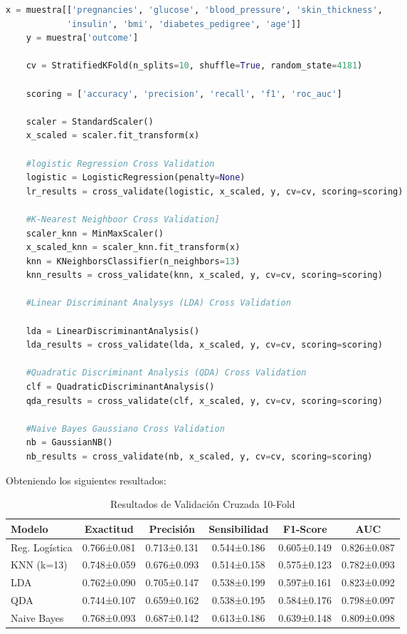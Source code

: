 \documentclass[12pt,a4paper]{article}
\begin{document}
\begin{lstlisting}[language=Python, frame=single, basicstyle=\ttfamily\small, breaklines=true]
    x = muestra[['pregnancies', 'glucose', 'blood_pressure', 'skin_thickness',
            'insulin', 'bmi', 'diabetes_pedigree', 'age']]
    y = muestra['outcome']

    cv = StratifiedKFold(n_splits=10, shuffle=True, random_state=4181)  

    scoring = ['accuracy', 'precision', 'recall', 'f1', 'roc_auc']

    scaler = StandardScaler()
    x_scaled = scaler.fit_transform(x)

    #logistic Regression Cross Validation
    logistic = LogisticRegression(penalty=None)
    lr_results = cross_validate(logistic, x_scaled, y, cv=cv, scoring=scoring)

    #K-Nearest Neighboor Cross Validation]
    scaler_knn = MinMaxScaler()
    x_scaled_knn = scaler_knn.fit_transform(x)
    knn = KNeighborsClassifier(n_neighbors=13)
    knn_results = cross_validate(knn, x_scaled, y, cv=cv, scoring=scoring)

    #Linear Discriminant Analysys (LDA) Cross Validation

    lda = LinearDiscriminantAnalysis()
    lda_results = cross_validate(lda, x_scaled, y, cv=cv, scoring=scoring)  

    #Quadratic Discriminant Analysis (QDA) Cross Validation
    clf = QuadraticDiscriminantAnalysis()
    qda_results = cross_validate(clf, x_scaled, y, cv=cv, scoring=scoring)  

    #Naive Bayes Gaussiano Cross Validation
    nb = GaussianNB()
    nb_results = cross_validate(nb, x_scaled, y, cv=cv, scoring=scoring)    
\end{lstlisting}

\newpage

Obteniendo los siguientes resultados:

\begin{table}[H]
\centering
\caption{Resultados de Validación Cruzada 10-Fold}\label{tab:cross_validation}
\footnotesize
\begin{tabular}{lccccc}
\toprule
\textbf{Modelo} & \textbf{Exactitud} & \textbf{Precisión} & \textbf{Sensibilidad} & \textbf{F1-Score} & \textbf{AUC} \\
\midrule
Reg. Logística & 0.766±0.081 & 0.713±0.131 & 0.544±0.186 & 0.605±0.149 & 0.826±0.087 \\
KNN (k=13) & 0.748±0.059 & 0.676±0.093 & 0.514±0.158 & 0.575±0.123 & 0.782±0.093 \\
LDA & 0.762±0.090 & 0.705±0.147 & 0.538±0.199 & 0.597±0.161 & 0.823±0.092 \\
QDA & 0.744±0.107 & 0.659±0.162 & 0.538±0.195 & 0.584±0.176 & 0.798±0.097 \\
Naive Bayes & 0.768±0.093 & 0.687±0.142 & 0.613±0.186 & 0.639±0.148 & 0.809±0.098 \\
\bottomrule
\end{tabular}
\end{table}
\end{document}
